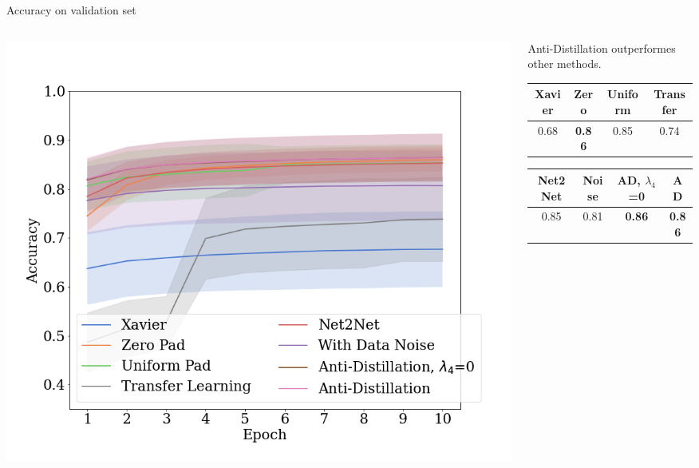 \documentclass[dvipsnames,aspectratio=169]{beamer}
\begin{document}
\begin{frame}{Accuracy on validation set}

    \begin{columns}
        \begin{column}{0.5\textwidth}
            \includegraphics[width=1.2\textwidth]{figures/file.png}    
        \end{column}

        \begin{column}{0.5\textwidth}
        \begin{center}
        Anti-Distillation outperformes other methods.
        \bigskip

        \begin{tabular}{|c|c|c|c|}
            \hline Xavier & Zero & Uniform & Transfer\\
             \hline 0.68 & \textbf{0.86} & 0.85 & 0.74 \\ 
             \hline
        \end{tabular}
    
            \bigskip 

            \begin{tabular}{|c|c|c|c|}
                \hline Net2Net & Noise & AD, $\lambda_4$=0 & AD\\
                \hline 0.85 & 0.81 & \textbf{0.86} & \textbf{0.86} \\
                \hline
            \end{tabular}
        \end{center}
        
        \end{column}
    \end{columns}


\end{frame}
\end{document}
